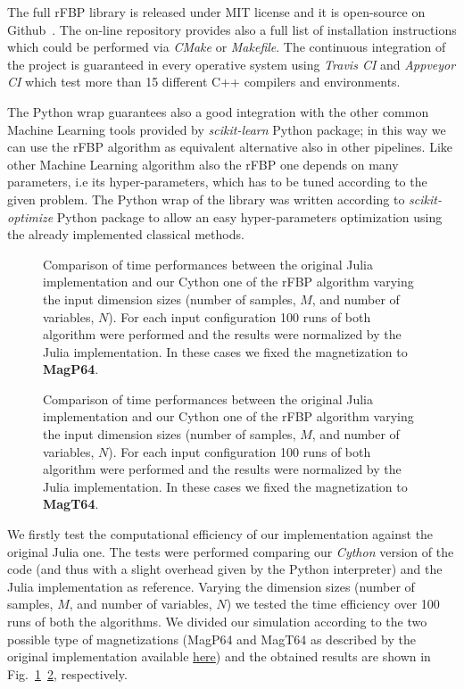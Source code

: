 \documentclass{standalone}
\begin{document}
The full rFBP library is released under MIT license and it is open-source on Github~\cite{ReplicatedFocusingBeliefPropagation}.
The on-line repository provides also a full list of installation instructions which could be performed via \emph{CMake} or \emph{Makefile}.
The continuous integration of the project is guaranteed in every operative system using \emph{Travis CI} and \emph{Appveyor CI} which test more than 15 different \textsf{C++} compilers and environments.

The Python wrap guarantees also a good integration with the other common Machine Learning tools provided by \emph{scikit-learn} Python package; in this way we can use the rFBP algorithm as equivalent alternative also in other pipelines.
Like other Machine Learning algorithm also the rFBP one depends on many parameters, i.e its hyper-parameters, which has to be tuned according to the given problem.
The Python wrap of the library was written according to \emph{scikit-optimize} Python package to allow an easy hyper-parameters optimization using the already implemented classical methods.


\begin{figure}[htbp]
\centering
\def\svgwidth{0.85\textwidth}

\caption{Comparison of time performances between the original Julia implementation and our Cython one of the rFBP algorithm varying the input dimension sizes (number of samples, $M$, and number of variables, $N$).
For each input configuration 100 runs of both algorithm were performed and the results were normalized by the Julia implementation.
In these cases we fixed the magnetization to \textbf{MagP64}.
}
\label{fig:rfbp_magp}
\end{figure}

\begin{figure}[htbp]
\centering
\def\svgwidth{0.85\textwidth}

\caption{Comparison of time performances between the original Julia implementation and our Cython one of the rFBP algorithm varying the input dimension sizes (number of samples, $M$, and number of variables, $N$).
For each input configuration 100 runs of both algorithm were performed and the results were normalized by the Julia implementation.
In these cases we fixed the magnetization to \textbf{MagT64}.
}
\label{fig:rfbp_magt}
\end{figure}

We firstly test the computational efficiency of our implementation against the original Julia one.
The tests were performed comparing our \emph{Cython} version of the code (and thus with a slight overhead given by the Python interpreter) and the Julia implementation as reference.
Varying the dimension sizes (number of samples, $M$, and number of variables, $N$) we tested the time efficiency over 100 runs of both the algorithms.
We divided our simulation according to the two possible type of magnetizations (MagP64 and MagT64 as described by the original implementation available \href{https://github.com/carlobaldassi/BinaryCommitteeMachineFBP.jl}{here}) and the obtained results are shown in Fig.~\ref{fig:rfbp_magp}~\ref{fig:rfbp_magt}, respectively.
\end{document}
